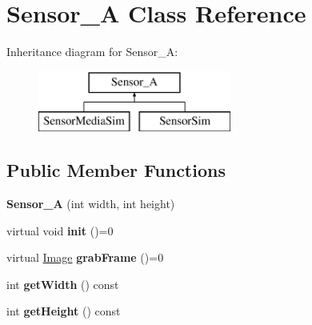 \hypertarget{class_sensor___a}{\section{Sensor\-\_\-\-A Class Reference}
\label{class_sensor___a}
}
Inheritance diagram for Sensor\-\_\-\-A\-:\begin{figure}[H]
\begin{center}
\leavevmode
\includegraphics[height=2.000000cm]{class_sensor___a}
\end{center}
\end{figure}
\subsection*{Public Member Functions}
\begin{DoxyCompactItemize}
\item 
\hypertarget{class_sensor___a_a2cedbe613f09c4b55bdf037c934f4d40}{{\bfseries Sensor\-\_\-\-A} (int width, int height)}\label{class_sensor___a_a2cedbe613f09c4b55bdf037c934f4d40}

\item 
\hypertarget{class_sensor___a_a75729f262677bce4415a14345b4a796c}{virtual void {\bfseries init} ()=0}\label{class_sensor___a_a75729f262677bce4415a14345b4a796c}

\item 
\hypertarget{class_sensor___a_ae34f4a1ed24847b22b8c7e68feb08483}{virtual \hyperlink{class_image}{Image} {\bfseries grab\-Frame} ()=0}\label{class_sensor___a_ae34f4a1ed24847b22b8c7e68feb08483}

\item 
\hypertarget{class_sensor___a_adb31a9fb92f2493eabb8bae07b9de74d}{int {\bfseries get\-Width} () const }\label{class_sensor___a_adb31a9fb92f2493eabb8bae07b9de74d}

\item 
\hypertarget{class_sensor___a_a4bc03abe623fb70ababd037c7f9e16fa}{int {\bfseries get\-Height} () const }\label{class_sensor___a_a4bc03abe623fb70ababd037c7f9e16fa}

\end{DoxyCompactItemize}
